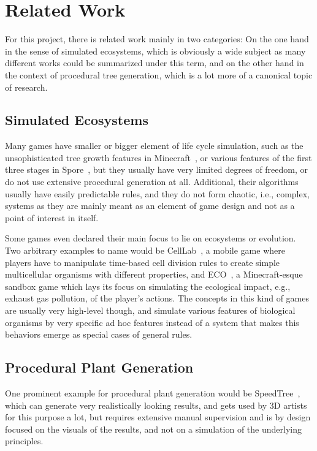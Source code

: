 \documentclass[11pt, abstract=on]{scrartcl}
\begin{document}
\section{Related Work}

For this project, there is related work mainly in two categories: On the one hand in the sense of simulated ecosystems, which is obviously a wide subject as many different works could be summarized under this term, and on the other hand in the context of procedural tree generation, which is a lot more of a canonical topic of research.

\subsection{Simulated Ecosystems}

Many games have smaller or bigger element of life cycle simulation, such as the unsophisticated tree growth features in Minecraft~\cite{MinecraftTree}, or various features of the first three stages in Spore~\cite{Spore}, but they usually have very limited degrees of freedom, or do not use extensive procedural generation at all. Additional, their algorithms usually have easily predictable rules, and they do not form chaotic, i.e., complex, systems as they are mainly meant as an element of game design and not as a point of interest in itself.

Some games even declared their main focus to lie on ecosystems or evolution. Two arbitrary examples to name would be CellLab~\cite{CellLab}, a mobile game where players have to manipulate time-based cell division rules to create simple multicellular organisms with different properties, and ECO~\cite{EcoGame}, a Minecraft-esque sandbox game which lays its focus on simulating the ecological impact, e.g., exhaust gas pollution, of the player's actions. The concepts in this kind of games are usually very high-level though, and simulate various features of biological organisms by very specific ad hoc features instead of a system that makes this behaviors emerge as special cases of general rules.

\subsection{Procedural Plant Generation}
One prominent example for procedural plant generation would be SpeedTree~\cite{SpeedTree}, which can generate very realistically looking results, and gets used by 3D artists for this purpose a lot, but requires extensive manual supervision and is by design focused on the visuals of the results, and not on a simulation of the underlying principles. 
\end{document}
